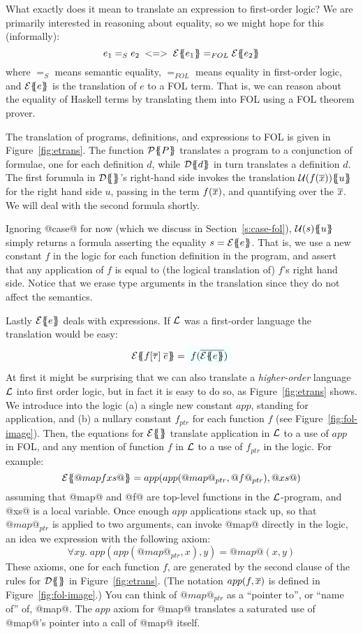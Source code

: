 What exactly does it mean to translate an expression to first-order logic?
We are primarily interested in reasoning about equality, so we might
hope for this (informally):
$$
e_1 =_S e_2 \;<=>\; \etrans{}{}{e_1} =_{FOL} \etrans{}{}{e_2}
$$
where $=_S$ means semantic equality, $=_{FOL}$ means equality in first-order logic,
and $\etrans{}{}{e}$ is the translation of $e$ to a FOL term. That is, we can 
reason about the equality of Haskell terms by translating them into FOL using
a FOL theorem prover. 

The translation of programs, definitions, and expressions to FOL
is given in Figure~\ref{fig:etrans}.
The function $\ptrans{}{P}$ translates a program to a conjunction of formulae,
one for each definition $d$, while $\dtrans{}{d}$ in turn translates 
a definition $d$.
The first forumula in $\dtrans{}{}$'s right-hand side invokes the translation
$\utrans{}{u}{f(\ol{x})}$ for the right hand side $u$, passing in the term $f(\ol{x})$,
and quantifying over the $\ol{x}$.  We will deal with the second formula shortly.

Ignoring @case@ for now (which we discuss in Section~\ref{s:case-fol}), $\utrans{}{u}{s}$
simply returns a formula asserting the equality $s = \etrans{}{}{e}$. 
That is, we use a new constant $f$ in the logic for each function definition in the
program, and assert that any application of $f$ is equal to (the logical translation of)
$f$'s right hand side. Notice that we erase type arguments in the translation
since they do not affect the semantics.

Lastly $\etrans{}{}{e}$ deals with expressions.  If $\cal L$ was 
a first-order language the translation would be easy:
$$
\etrans{\Sigma}{\Gamma}{f[\ol{\tau}]\;\ol{e}} = \formula{f(\ol{\etrans{}{}{e}})} \\
$$
At first it might be surprising that we can also translate a \emph{higher-order} language
$\cal L$ into first order logic, but in fact it is easy to do so, as 
Figure~\ref{fig:etrans} shows.  We introduce into the logic
(a) a single new constant $app$, standing
for application, and (b) a nullary constant $f_{ptr}$ for each function $f$ 
(see Figure~\ref{fig:fol-image}).
Then, the equations for $\etrans{}{}{}$ translate application in $\cal L$ to 
a use of $app$ in FOL, and any mention of function $f$ in $\cal L$ to a use
of $f_{ptr}$ in the logic.  For example:
$$
\etrans{}{}{@map f xs@} = app( app( @map@_{ptr}, @f@_{ptr}), @xs@)
$$
assuming that @map@ and @f@ are top-level functions in the $\cal L$-program, and
@xs@ is a local variable.  Once enough $app$ applications stack up, so that 
$@map@_{ptr}$ is applied to two arguments, can invoke @map@ directly in the logic,
an idea we expression with the following axiom:
$$
\forall x y.\;app(app(@map@_{ptr}, x), y) = @map@(x,y)
$$
These axioms, one for each function $f$, are generated by the second
clause of the rules for $\dtrans{}{}{}$ in Figure~\ref{fig:etrans}.
(The notation $app(f,\ol{x})$ is defined in Figure~\ref{fig:fol-image}.)
You can think of $@map@_{ptr}$ as a ``pointer to'', or ``name of'' of, @map@.
The $app$ axiom for @map@ translates a saturated use of @map@'s pointer into
a call of @map@ itself.   

